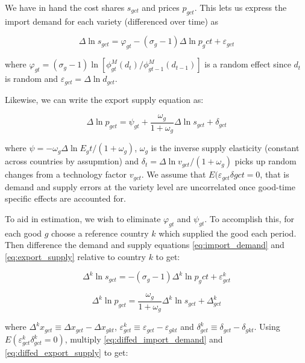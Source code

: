 \documentclass[12pt,a4paper]{article}                      %
\begin{document}
We have in hand the cost shares $s_{gct}$ and prices $p_{gct}$. This lets us express the import demand for each variety (differenced over time) as

\begin{equation}\label{eq:import_demand}
    \Delta \ln{s_{gct}} = \varphi_{gt} - (\sigma_g - 1) \Delta \ln{p_gct} + \varepsilon_{gct}
\end{equation}

where $\varphi_{gt} = (\sigma_g - 1) \ln{[\phi_{gt}^M (d_t) / \phi_{gt - 1}^M (d_{t - 1})]}$ is a random effect since $d_t$ is random and $\varepsilon_{gct} = \Delta \ln{d_{gct}}$.

Likewise, we can write the export supply equation as:

\begin{equation}\label{eq:export_supply}
    \Delta \ln{p_{gct}} = \psi_{gt} + \frac{\omega_g}{1 + \omega_g} \Delta \ln{s_{gct} + \delta_{gct}}
\end{equation}

where $\psi = -\omega_g \Delta \ln{E_gt / (1 + \omega_g)}$, $\omega_g$ is the inverse supply elasticity (constant across countries by assupmtion) and $\delta_t =  \Delta \ln{v_{gct} / (1 + \omega_g)}$ picks up random changes from a technology factor $v_{gct}$.  We assume that $E(\varepsilon_{gct}\delta{gct} = 0$, that is demand and supply errors at the variety level are uncorrelated once good-time specific effects are accounted for.

To aid in estimation, we wish to eliminate $\varphi_{gt}$ and $\psi_{gt}$.  To accomplish this, for each good $g$ choose a reference country $k$ which supplied the good each period.  Then difference the demand and supply equations \ref{eq:import_demand} and \ref{eq:export_supply} relative to country $k$ to get:

\begin{equation}\label{eq:diffed_import_demand}
    \Delta^k \ln{s_{gct}} = - (\sigma_g - 1) \Delta^k \ln{p_gct} + \varepsilon^k_{gct}
\end{equation}

\begin{equation}\label{eq:diffed_export_supply}
    \Delta^k \ln{p_{gct}} = \frac{\omega_g}{1 + \omega_g} \Delta^k \ln{s_{gct}} + \Delta^k_{gct}
\end{equation}

where $\Delta^k x_{gct} \equiv \Delta x_{gct} - \Delta x_{gkt}$, $\varepsilon^k_{gct} \equiv \varepsilon_{gct} - \varepsilon_{gkt}$ and $\delta^k_{gct} \equiv \delta_{gct} - \delta_{gkt}$.
Using $E(\varepsilon_{gct}^k \delta^k_{gct} = 0)$, multiply \ref{eq:diffed_import_demand} and \ref{eq:diffed_export_supply} to get:
\end{document}
